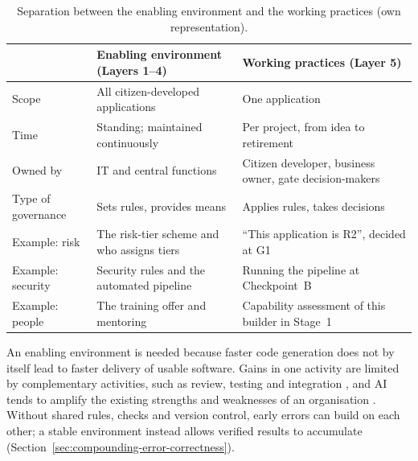 \documentclass[10pt,a4paper]{article}
\begin{document}
\begin{table}[H]
    \centering
    \small
    \caption{Separation between the enabling environment and the working
    practices (own representation).}
    \label{tab:environment-vs-practices}
    \begin{tabular}{@{}p{2.8cm} p{5.4cm} p{5.4cm}@{}}
    \toprule
    & \textbf{Enabling environment (Layers 1--4)} &
        \textbf{Working practices (Layer 5)} \\
    \midrule
    Scope & All citizen-developed applications & One application \\
    \addlinespace
    Time & Standing; maintained continuously & Per project, from idea
        to retirement \\
    \addlinespace
    Owned by & IT and central functions & Citizen developer, business
        owner, gate decision-makers \\
    \addlinespace
    Type of governance & Sets rules, provides means & Applies rules,
        takes decisions \\
    \addlinespace
    Example: risk & The risk-tier scheme and who assigns tiers &
        \enquote{This application is R2}, decided at G1 \\
    \addlinespace
    Example: security & Security rules and the automated pipeline &
        Running the pipeline at Checkpoint~B \\
    \addlinespace
    Example: people & The training offer and mentoring & Capability
        assessment of this builder in Stage~1 \\
    \bottomrule
    \end{tabular}
\end{table}

An enabling environment is needed because faster code generation does
not by itself lead to faster delivery of usable software. Gains in one
activity are limited by complementary activities, such as review,
testing and integration \parencite{demirer2026}, and AI tends to amplify
the existing strengths and weaknesses of an organisation
\parencite{dora2025}. Without shared rules, checks and version control,
early errors can build on each other; a stable environment instead
allows verified results to accumulate
(Section~\ref{sec:compounding-error-correctness}).
\end{document}
